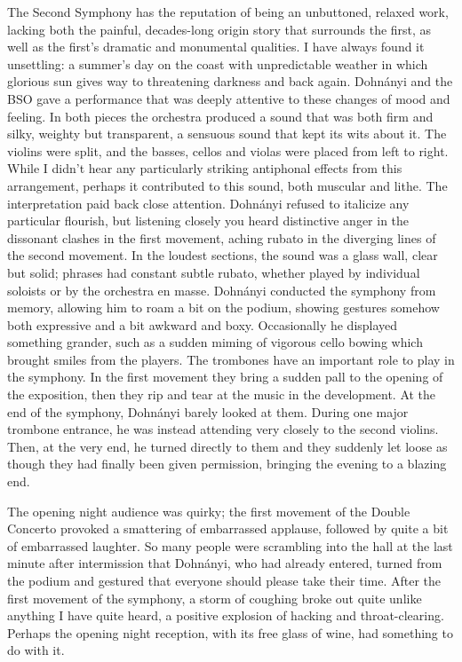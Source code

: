 The Second Symphony has the reputation of being an unbuttoned, relaxed work, lacking both the painful, decades-long origin story that surrounds the first, as well as the first’s dramatic and monumental qualities. I have always found it unsettling: a summer’s day on the coast with unpredictable weather in which glorious sun gives way to threatening darkness and back again. Dohnányi and the BSO gave a performance that was deeply attentive to these changes of mood and feeling. In both pieces the orchestra produced a sound that was both firm and silky, weighty but transparent, a sensuous sound that kept its wits about it. The violins were split, and the basses, cellos and violas were placed from left to right. While I didn’t hear any particularly striking antiphonal effects from this arrangement, perhaps it contributed to this sound, both muscular and lithe. The interpretation paid back close attention. Dohnányi refused to italicize any particular flourish, but listening closely you heard distinctive anger in the dissonant clashes in the first movement, aching rubato in the diverging lines of the second movement. In the loudest sections, the sound was a glass wall, clear but solid; phrases had constant subtle rubato, whether played by individual soloists or by the orchestra en masse. Dohnányi conducted the symphony from memory, allowing him to roam a bit on the podium, showing gestures somehow both expressive and a bit awkward and boxy. Occasionally he displayed something grander, such as a sudden miming of vigorous cello bowing which brought smiles from the players. The trombones have an important role to play in the symphony. In the first movement they bring a sudden pall to the opening of the exposition, then they rip and tear at the music in the development. At the end of the symphony, Dohnányi barely looked at them. During one major trombone entrance, he was instead attending very closely to the second violins. Then, at the very end, he turned directly to them and they suddenly let loose as though they had finally been given permission, bringing the evening to a blazing end.

The opening night audience was quirky; the first movement of the Double Concerto provoked a smattering of embarrassed applause, followed by quite a bit of embarrassed laughter. So many people were scrambling into the hall at the last minute after intermission that Dohnányi, who had already entered, turned from the podium and gestured that everyone should please take their time. After the first movement of the symphony, a storm of coughing broke out quite unlike anything I have quite heard, a positive explosion of hacking and throat-clearing. Perhaps the opening night reception, with its free glass of wine, had something to do with it.


